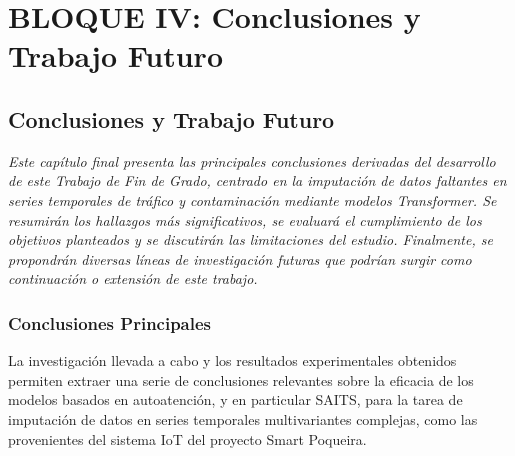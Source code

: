\part{BLOQUE IV: Conclusiones y Trabajo Futuro}
\chapter{Conclusiones y Trabajo Futuro}
\label{chap:conclusiones}
\glsresetall

\textit{Este capítulo final presenta las principales conclusiones derivadas del desarrollo de este Trabajo de Fin de Grado, centrado en la imputación de datos faltantes en series temporales de tráfico y contaminación mediante modelos Transformer. Se resumirán los hallazgos más significativos, se evaluará el cumplimiento de los objetivos planteados y se discutirán las limitaciones del estudio. Finalmente, se propondrán diversas líneas de investigación futuras que podrían surgir como continuación o extensión de este trabajo.}

\section{Conclusiones Principales}
\label{sec:conclusiones_principales}

La investigación llevada a cabo y los resultados experimentales obtenidos permiten extraer una serie de conclusiones relevantes sobre la eficacia de los modelos basados en autoatención, y en particular SAITS, para la tarea de imputación de datos en series temporales multivariantes complejas, como las provenientes del sistema IoT del proyecto Smart Poqueira.

